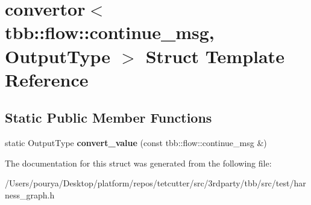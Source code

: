 \hypertarget{structconvertor_3_01tbb_1_1flow_1_1continue__msg_00_01OutputType_01_4}{}\section{convertor$<$ tbb\+:\+:flow\+:\+:continue\+\_\+msg, Output\+Type $>$ Struct Template Reference}
\label{structconvertor_3_01tbb_1_1flow_1_1continue__msg_00_01OutputType_01_4}
\subsection*{Static Public Member Functions}
\begin{DoxyCompactItemize}
\item 
\hypertarget{structconvertor_3_01tbb_1_1flow_1_1continue__msg_00_01OutputType_01_4_a34d9ae5d6952fa1075c200dc8a660a6b}{}static Output\+Type {\bfseries convert\+\_\+value} (const tbb\+::flow\+::continue\+\_\+msg \&)\label{structconvertor_3_01tbb_1_1flow_1_1continue__msg_00_01OutputType_01_4_a34d9ae5d6952fa1075c200dc8a660a6b}

\end{DoxyCompactItemize}


The documentation for this struct was generated from the following file\+:\begin{DoxyCompactItemize}
\item 
/\+Users/pourya/\+Desktop/platform/repos/tetcutter/src/3rdparty/tbb/src/test/harness\+\_\+graph.\+h\end{DoxyCompactItemize}
